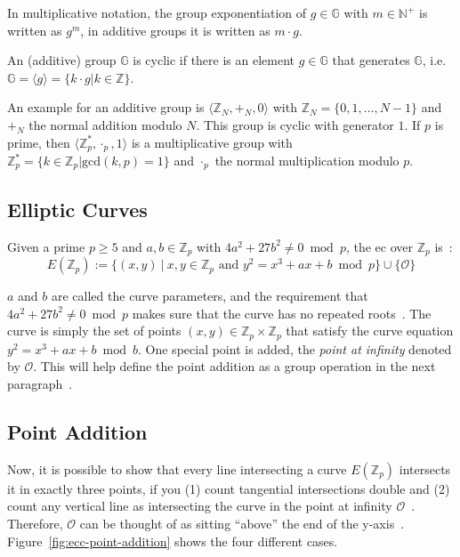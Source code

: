 In multiplicative notation, the group exponentiation of $g \in \mathbb{G}$ with $m \in \mathbb{N}^+$ is written as $g^m$, in additive groups it is written as $m \cdot g$.

\begin{definition}
    An (additive) group $\mathbb{G}$ is cyclic if there is an element $g \in \mathbb{G}$ that generates $\mathbb{G}$, i.e. $\mathbb{G} = \langle g \rangle = \{k \cdot g | k \in \mathbb{Z}\}$.
\end{definition}

An example for an additive group is $\langle \mathbb{Z}_N, +_N, 0 \rangle$ with $\mathbb{Z}_N = \{0, 1, \dots, N-1\}$ and $+_N$ the normal addition modulo $N$.
This group is cyclic with generator $1$.
If $p$ is prime, then $\langle \mathbb{Z}^*_p, \cdot_p, 1 \rangle$ is a multiplicative group with $\mathbb{Z}^*_p = \{k \in \mathbb{Z}_p | \text{gcd}(k,p) = 1\}$ and $\cdot_p$ the normal multiplication modulo $p$.



\subsection{Elliptic Curves}

\begin{definition}
    Given a prime $p \geq 5$ and $a, b \in \mathbb{Z}_p$ with $4a^2 + 27b^2 \neq 0 \bmod{p}$, the \gls{ec} over $\mathbb{Z}_p$ is~\cite{katz_introduction_2015}:
    \begin{equation}
        E(\mathbb{Z}_p) := \{(x, y)~|~x,y \in \mathbb{Z}_p \text{ and } y^2 = x^3 + a x + b \bmod{p}\} \cup \{\mathcal{O}\}
    \end{equation}
\end{definition}

$a$ and $b$ are called the curve parameters, and the requirement that $4a^2 + 27b^2 \neq 0 \bmod{p}$ makes sure that the curve has no repeated roots~\cite{katz_introduction_2015}.
The curve is simply the set of points $(x, y) \in \mathbb{Z}_p \times \mathbb{Z}_p$ that satisfy the curve equation $y^2 = x^3 + a x + b \bmod{b}$.
One special point is added, the \emph{point at infinity} denoted by $\mathcal{O}$.
This will help define the point addition as a group operation in the next paragraph~\cite{katz_introduction_2015}.

\subsection{Point Addition}
Now, it is possible to show that every line intersecting a curve $E(\mathbb{Z}_p)$ intersects it in exactly three points, if you (1) count tangential intersections double and (2) count any vertical line as intersecting the curve in the point at infinity $\mathcal{O}$~\cite{katz_introduction_2015}.
Therefore, $\mathcal{O}$ can be thought of as sitting ``above'' the end of the y-axis~\cite{katz_introduction_2015}.
Figure~\ref{fig:ecc-point-addition} shows the four different cases.

